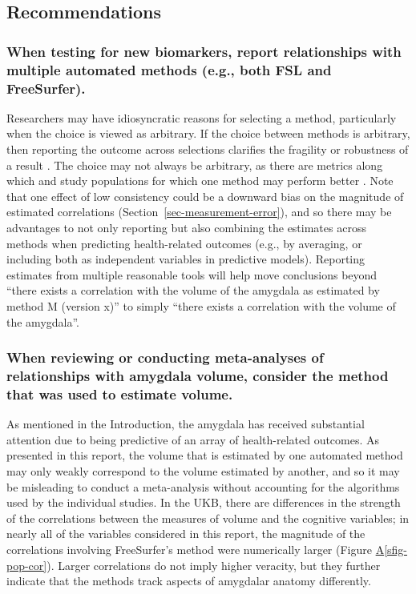 \documentclass[
  authoryear,
  preprint,
  1p]{elsarticle}
\newcommand*\quartosfigref[1]{Figure \hyperref[#1]{A\ref{#1}}}
\begin{document}
\subsection{Recommendations}\label{recommendations}

\subsubsection{When testing for new biomarkers, report relationships
with multiple automated methods (e.g., both FSL and
FreeSurfer).}\label{when-testing-for-new-biomarkers-report-relationships-with-multiple-automated-methods-e.g.-both-fsl-and-freesurfer.}

Researchers may have idiosyncratic reasons for selecting a method,
particularly when the choice is viewed as arbitrary. If the choice
between methods is arbitrary, then reporting the outcome across
selections clarifies the fragility or robustness of a result \citep[for
a general discussion, see][]{steegen_increasing_2016}. The choice may
not always be arbitrary, as there are metrics along which and study
populations for which one method may perform better
\citep{zhou_charting_2021, morey2009, huizinga_differences_2021}. Note
that one effect of low consistency could be a downward bias on the
magnitude of estimated correlations
(Section~\ref{sec-measurement-error}), and so there may be advantages to
not only reporting but also combining the estimates across methods when
predicting health-related outcomes (e.g., by averaging, or including
both as independent variables in predictive models). Reporting estimates
from multiple reasonable tools will help move conclusions beyond ``there
exists a correlation with the volume of the amygdala as estimated by
method M (version x)'' to simply ``there exists a correlation with the
volume of the amygdala''.

\subsubsection{When reviewing or conducting meta-analyses of
relationships with amygdala volume, consider the method that was used to
estimate
volume.}\label{when-reviewing-or-conducting-meta-analyses-of-relationships-with-amygdala-volume-consider-the-method-that-was-used-to-estimate-volume.}

As mentioned in the Introduction, the amygdala has received substantial
attention due to being predictive of an array of health-related
outcomes. As presented in this report, the volume that is estimated by
one automated method may only weakly correspond to the volume estimated
by another, and so it may be misleading to conduct a meta-analysis
without accounting for the algorithms used by the individual studies. In
the UKB, there are differences in the strength of the correlations
between the measures of volume and the cognitive variables; in nearly
all of the variables considered in this report, the magnitude of the
correlations involving FreeSurfer's method were numerically larger
(\quartosfigref{sfig-pop-cor}). Larger correlations do not imply higher
veracity, but they further indicate that the methods track aspects of
amygdalar anatomy differently.
\end{document}
